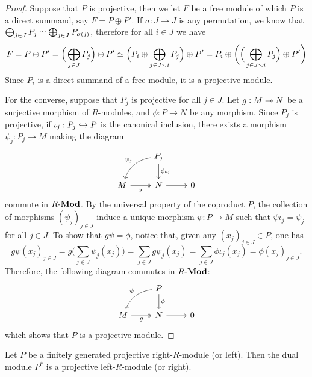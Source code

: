 \begin{proof}
Suppose that \(P\) is projective, then we let \(F\) be a free module of which
\(P\) is a direct summand, say \(F = P \oplus P'\). If \(\sigma: J \to J\) is
any permutation, we know that \(\bigoplus_{j \in J} P_j \simeq
\bigoplus_{j \in J} P_{\sigma(j)}\), therefore for all \(i \in J\) we have
\[
F = P \oplus P' = \Big( \bigoplus_{j \in J} P_j \Big) \oplus P'
\simeq \Big( P_i \oplus \bigoplus_{j \in J \smallsetminus i} P_j \Big) \oplus P'
= P_i \oplus \bigg(\Big(\bigoplus_{j \in J \smallsetminus i} P_j \Big) \oplus P'\bigg)
\]
Since \(P_i\) is a direct summand of a free module, it is a projective module.

For the converse, suppose that \(P_j\) is projective for all \(j \in J\). Let
\(g: M \twoheadrightarrow N\) be a surjective morphism of \(R\)-modules, and \(\phi: P \to N\)
be any morphism. Since \(P_j\) is projective, if \(\iota_j: P_j \hookrightarrow P\) is the
canonical inclusion, there exists a morphism \(\psi_j: P_j \to M\) making the
diagram
\[
\begin{tikzcd}
&P_j \ar[d, "\phi \iota_j"] \ar[dl, bend right, "\psi_j"'] &\\
M \ar[r, two heads, "g"'] &N \ar[r] &0
\end{tikzcd}
\]
commute in \({R\text{-}\textbf{Mod}}\). By the universal property of the coproduct \(P\), the
collection of morphisms \((\psi_j)_{j \in J}\) induce a unique morphism \(\psi:
P \to M\) such that \(\psi \iota_j = \psi_j\) for all \(j \in J\). To show that
\(g \psi = \phi\), notice that, given any \((x_j)_{j \in J} \in P\), one has
\[
g \psi(x_j)_{j \in J} = g \Big(\sum_{j \in J} \psi_j(x_j)\Big)
= \sum_{j \in J} g \psi_j(x_j)
= \sum_{j \in J} \phi \iota_j(x_j)
= \phi(x_j)_{j \in J}.
\]
Therefore, the following diagram commutes in \({R\text{-}\textbf{Mod}}\):
\[
\begin{tikzcd}
&P \ar[d, "\phi"] \ar[dl, bend right, "\psi"'] &\\
M \ar[r, two heads, "g"'] &N \ar[r] &0
\end{tikzcd}
\]
which shows that \(P\) is a projective module.
\end{proof}

\begin{proposition}
\label{prop:fg-projective-then-dual-module-is-projective}
Let \(P\) be a finitely generated projective right-\(R\)-module (or left). Then
the dual module \(P^{*}\) is a projective left-\(R\)-module (or right).
\end{proposition}

